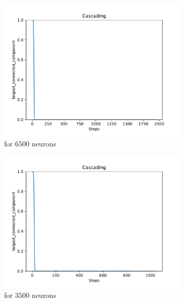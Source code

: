 \begin{figure}
	\begin{subfigure}[b]{0.45\textwidth}
		\centering
		\includegraphics[width=\textwidth]{Images/plots_cascading/cascading_28.pdf}
		\caption{for $6500$ neurons}
	\end{subfigure}
	\hfill
	\begin{subfigure}[b]{0.45\textwidth}
		\centering
		\includegraphics[width=\textwidth]{Images/plots_cascading/cascading_34.pdf}
		\caption{for $3500$ neurons}
	\end{subfigure}
	\\ \vspace{5mm}
	\begin{subfigure}[b]{0.45\textwidth}

\end{subfigure}
\end{figure}
